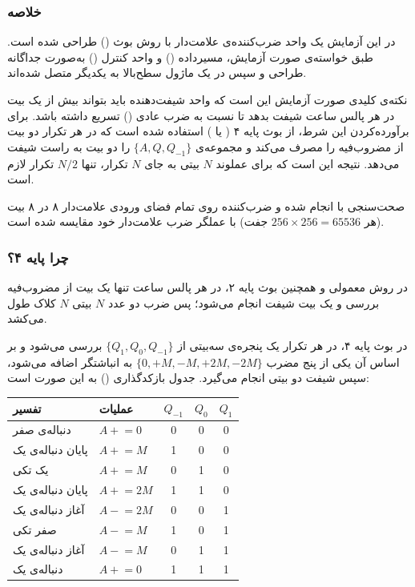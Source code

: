 \documentclass[10pt,a4paper]{article}
\begin{document}

\subsubsection*{خلاصه}

در این آزمایش یک واحد ضرب‌کننده‌ی علامت‌دار با روش {بوث} () طراحی شده است. طبق خواسته‌ی صورت آزمایش، مسیرداده () و واحد کنترل () به‌صورت {جداگانه} طراحی و سپس در یک ماژول سطح‌بالا به یکدیگر متصل شده‌اند.

نکته‌ی کلیدی صورت آزمایش این است که واحد شیفت‌دهنده باید بتواند {بیش از یک بیت در هر پالس ساعت} شیفت بدهد تا نسبت به ضرب عادی () تسریع داشته باشد. برای برآورده‌کردن این شرط، از {بوث پایه ۴} ( یا ) استفاده شده است که در هر تکرار {دو بیت} از مضروب‌فیه را مصرف می‌کند و مجموعه‌ی $\{A, Q, Q_{-1}\}$ را {دو بیت به راست} شیفت می‌دهد. نتیجه این است که برای عملوند $N$ بیتی به جای $N$ تکرار، تنها $N/2$ تکرار لازم است.

صحت‌سنجی با  انجام شده و ضرب‌کننده روی {تمام} فضای ورودی علامت‌دار ۸ در ۸ بیت (هر $256 \times 256 = 65536$ جفت) با عملگر ضرب علامت‌دار خود  مقایسه شده است.

\subsubsection*{چرا پایه ۴؟}

در روش  معمولی و همچنین بوث پایه ۲، در هر پالس ساعت تنها {یک} بیت از مضروب‌فیه بررسی و یک بیت شیفت انجام می‌شود؛ پس ضرب دو عدد $N$ بیتی $N$ کلاک طول می‌کشد.

در بوث پایه ۴، در هر تکرار یک پنجره‌ی {سه‌بیتی} از $\{Q_1, Q_0, Q_{-1}\}$ بررسی می‌شود و بر اساس آن یکی از پنج مضرب $\{0, +M, -M, +2M, -2M\}$ به انباشتگر اضافه می‌شود، سپس شیفت {دو بیتی} انجام می‌گیرد. جدول بازکدگذاری () به این صورت است:

\begin{center}
\begin{tabular}{@{}ll ccc@{}}
\toprule
{تفسیر} & {عملیات} & $Q_{-1}$ & $Q_0$ & $Q_1$ \\
\midrule
دنباله‌ی صفر       & $A \mathrel{+}= 0$  & 0 & 0 & 0 \\
پایان دنباله‌ی یک  & $A \mathrel{+}= M$  & 1 & 0 & 0 \\
یک تکی             & $A \mathrel{+}= M$  & 0 & 1 & 0 \\
پایان دنباله‌ی یک  & $A \mathrel{+}= 2M$ & 1 & 1 & 0 \\
آغاز دنباله‌ی یک   & $A \mathrel{-}= 2M$ & 0 & 0 & 1 \\
صفر تکی            & $A \mathrel{-}= M$  & 1 & 0 & 1 \\
آغاز دنباله‌ی یک   & $A \mathrel{-}= M$  & 0 & 1 & 1 \\
دنباله‌ی یک        & $A \mathrel{+}= 0$  & 1 & 1 & 1 \\
\bottomrule
\end{tabular}
\end{center}
\end{document}
